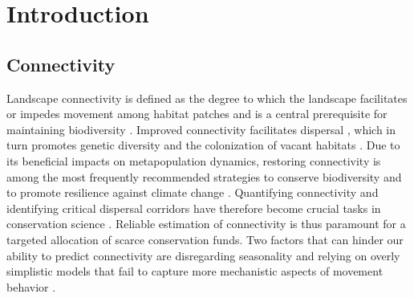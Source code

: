 \documentclass[abstract=on,10pt,a4paper,bibliography=totocnumbered]{article}
\begin{document}
\begin{abstract}
Through cross-validation, we evaluate predictive performance across various
seasonal configurations, and between simplistic and realistic movement models.
We hypothesized that incorporating seasonality and adopting a more realistic
view would improve predictions.

Contrary to expectations, our results showed that, while accounting for
seasonality across all three stages of the modeling pipeline moderately improved
predictions in the simplistic model, its benefits disappeared in the realistic
approach, which already achieved strong predictive performance. Our study
provides a conceptual framework for integrating seasonality into connectivity
analyses and shows that, for our study system, a more realistic representation
of movement outperformed the incorporation of seasonality. This suggests that
connectivity studies should prioritize realistic movement models over simplistic
approaches while carefully considering when and how to account for seasonal
dynamism.

\end{abstract}

\newpage

\onehalfspacing
\tableofcontents
\doublespacing



\section{Introduction}

\subsection{Connectivity}

Landscape connectivity is defined as the degree to which the landscape
facilitates or impedes movement among habitat patches \citep{Taylor.1993} and is
a central prerequisite for maintaining biodiversity \citep{Fahrig.2003}.
Improved connectivity facilitates dispersal \citep{Doerr.2011, Baguette.2013},
which in turn promotes genetic diversity \citep{Perrin.2000, Frankham.2002} and
the colonization of vacant habitats \citep{Hanski.1999, MacArthur.2001}. Due to
its beneficial impacts on metapopulation dynamics, restoring connectivity is
among the most frequently recommended strategies to conserve biodiversity and to
promote resilience against climate change \citep{Heller.2009, Rudnick.2012}.
Quantifying connectivity and identifying critical dispersal corridors have
therefore become crucial tasks in conservation science \citep{Heller.2009,
Rudnick.2012, Keeley.2019, Hofmann.2021}. Reliable estimation of connectivity is
thus paramount for a targeted allocation of scarce conservation funds. Two
factors that can hinder our ability to predict connectivity are disregarding
seasonality and relying on overly simplistic models that fail to capture more
mechanistic aspects of movement behavior \citep{Osipova.2019, Zeller.2020a,
Hofmann.2023}.
\end{document}

